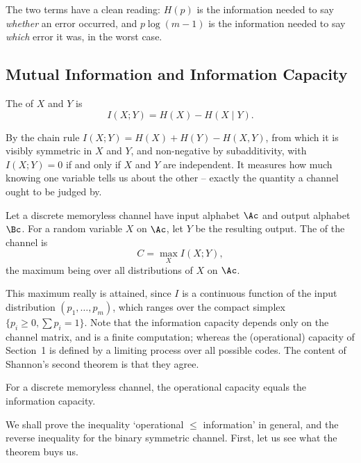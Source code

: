 The two terms have a clean reading: $H(p)$ is the information needed to say \emph{whether} an error occurred, and $p\log(m-1)$ is the information needed to say \emph{which} error it was, in the worst case.

\subsection{Mutual Information and Information Capacity}

\begin{definition}
	The  of $X$ and $Y$ is
	$$I(X;Y) = H(X)-H(X\mid Y).$$
\end{definition}

By the chain rule $I(X;Y) = H(X)+H(Y)-H(X,Y)$, from which it is visibly symmetric in $X$ and $Y$, and non-negative by subadditivity, with $I(X;Y)=0$ if and only if $X$ and $Y$ are independent. It measures how much knowing one variable tells us about the other -- exactly the quantity a channel ought to be judged by.

\begin{definition}
	Let a discrete memoryless channel have input alphabet $\Ac$ and output alphabet $\Bc$. For a random variable $X$ on $\Ac$, let $Y$ be the resulting output. The  of the channel is
	$$C = \max_X I(X;Y),$$
	the maximum being over all distributions of $X$ on $\Ac$.
\end{definition}

This maximum really is attained, since $I$ is a continuous function of the input distribution $(p_1,\dots,p_m)$, which ranges over the compact simplex $\{p_i \ge 0, \sum p_i = 1\}$. Note that the information capacity depends only on the channel matrix, and is a finite computation; whereas the (operational) capacity of Section~1 is defined by a limiting process over all possible codes. The content of Shannon's second theorem is that they agree.

\begin{theorem}\label{thm:secondcoding}
	For a discrete memoryless channel, the operational capacity equals the information capacity.
\end{theorem}

We shall prove the inequality `operational $\le$ information' in general, and the reverse inequality for the binary symmetric channel. First, let us see what the theorem buys us.

